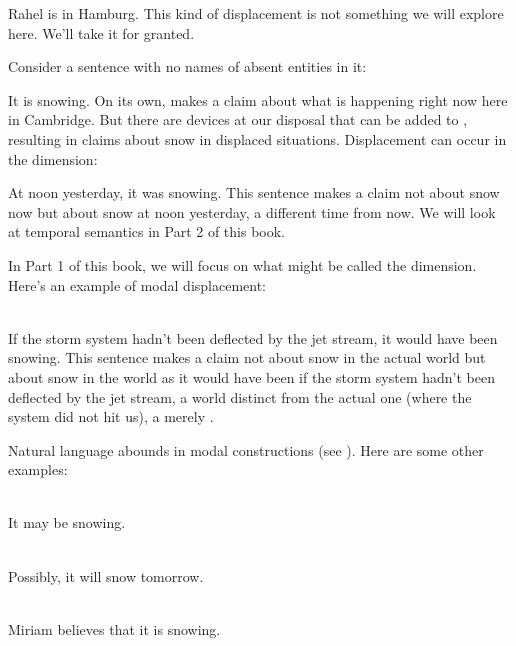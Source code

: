 \ex Rahel is in Hamburg. \xe
%
This kind of displacement is not something we will explore here. We'll take it
for granted.

Consider a sentence with no names of absent entities in it:

\ex It is snowing. \xe
%
On its own, \Last makes a claim about what is happening right now here in
Cambridge. But there are devices at our disposal that can be added to \Last,
resulting in claims about snow in displaced situations. Displacement can occur
in the  dimension: 

\ex At noon yesterday, it was snowing. \xe
%
This sentence makes a claim not about snow now but about snow at noon yesterday,
a different time from now. We will look at temporal semantics in Part 2 of this
book.

\kwn%
%
%
In Part 1 of this book, we will focus on what might be called the 
dimension. Here's an example of modal displacement:

\ex {}\\
If the storm system hadn't been deflected by the jet stream, it would have
been snowing. \xe
%
This sentence makes a claim not about snow in the actual world but about snow in
the world as it would have been if the storm system hadn't been deflected by the
jet stream, a world distinct from the actual one (where the system did not hit
us), a merely .

Natural language abounds in modal constructions (see
\cite{kratzer-1981-notional}). Here are some other examples:

%
%
\ex {}\\
It may be snowing. \xe

\ex~ \\
Possibly, it will snow tomorrow. \xe

\ex~ \\
Miriam believes that it is snowing. \xe

